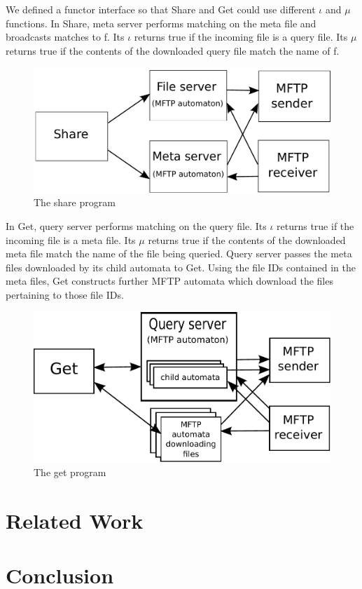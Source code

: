 \documentclass[letterpaper]{article}
\begin{document}
We defined a functor interface so that Share and Get could use different $\iota$ and $\mu$ functions.
In Share, meta server performs matching on the meta file and broadcasts matches to f.
Its $\iota$ returns true if the incoming file is a query file.
Its $\mu$ returns true if the contents of the downloaded query file match the name of f.

\begin{figure}
  \center
  \includegraphics[scale=0.65]{share_diagram}
  \caption{The share program \label{EvaluationOne}}
\end{figure}

In Get, query server performs matching on the query file.
Its $\iota$ returns true if the incoming file is a meta file.
Its $\mu$ returns true if the contents of the downloaded meta file match the name of the file being queried.
Query server passes the meta files downloaded by its child automata to Get.
Using the file IDs contained in the meta files, Get constructs further MFTP automata which download the files pertaining to those file IDs.

\begin{figure}
  \center
  \includegraphics[scale=0.65]{get_diagram}
  \caption{The get program \label{EvalutationTwo}}
\end{figure}

\section{Related Work}

\section{Conclusion}
\end{document}
